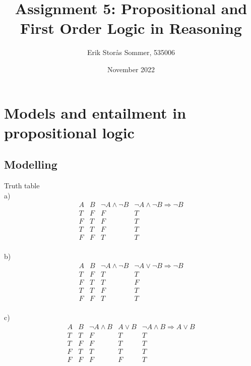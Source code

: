 \documentclass{article}
\title{Assignment 5: Propositional and First Order Logic in Reasoning}
\author{Erik Storås Sommer, 535006}
\date{November 2022}
\begin{document}
\maketitle

\section{Models and entailment in propositional logic}

\subsection{Modelling}

Truth table\\

a)\\
\begin{displaymath}
\begin{array}{|c|c|c|c|c}

A & 
B & 
\neg A \wedge \neg B &
\neg A \wedge \neg B \Rightarrow \neg B\\ %
\hline  %
T & F & F & T\\
F & T & F & T\\
T & T & F & T\\
F & F & T & T\\

\end{array}
\end{displaymath}


b)\\
\begin{displaymath}
\begin{array}{|c|c|c|c|c}

A &
B & 
\neg A \wedge \neg B &
\neg A \vee \neg B \Rightarrow \neg B\\ %
\hline  %
T & F & T & T\\
F & T & T & F\\
T & T & F & T\\
F & F & T & T\\

\end{array}
\end{displaymath}


c)\\
\begin{displaymath}
\begin{array}{|c|c|c|c|c|c}

A & 
B & 
\neg A \wedge B & 
A \vee B & \neg A \wedge B \Rightarrow A \vee B\\ %
\hline  %
T & T & F & T & T\\
T & F & F & T & T\\
F & T & T & T & T\\
F & F & F & F & T\\

\end{array}
\end{displaymath}
\end{document}
